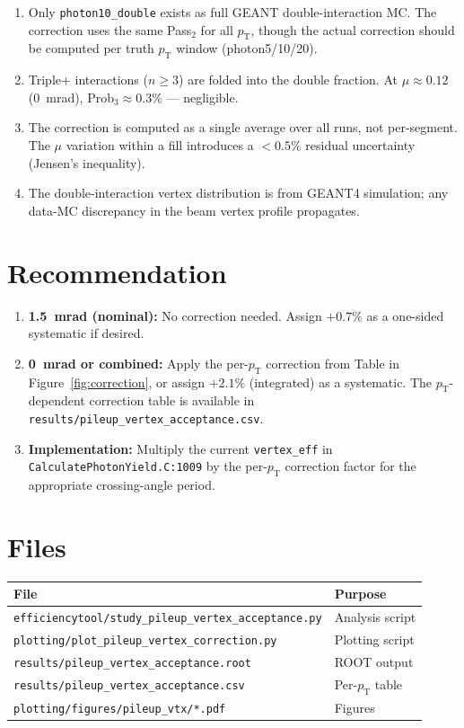 \documentclass[11pt,letterpaper]{article}
\newcommand{\pT}{\ensuremath{p_{\text{T}}}}
\begin{document}
\begin{enumerate}
  \item Only \texttt{photon10\_double} exists as full GEANT
    double-interaction MC. The correction uses the same
    Pass$_2$ for all $\pT$, though the actual correction should
    be computed per truth $\pT$ window (photon5/10/20).
  \item Triple+ interactions ($n \geq 3$) are folded into the
    double fraction. At $\mu \approx 0.12$ (0~mrad),
    Prob$_3 \approx 0.3\%$ --- negligible.
  \item The correction is computed as a single average over all
    runs, not per-segment. The $\mu$ variation within a fill
    introduces a $< 0.5\%$ residual uncertainty (Jensen's inequality).
  \item The double-interaction vertex distribution is from GEANT4
    simulation; any data-MC discrepancy in the beam vertex profile
    propagates.
\end{enumerate}

\section{Recommendation}
\label{sec:recommendation}

\begin{enumerate}
  \item \textbf{1.5~mrad (nominal):} No correction needed.
    Assign $+0.7\%$ as a one-sided systematic if desired.
  \item \textbf{0~mrad or combined:} Apply the per-$\pT$
    correction from Table in Figure~\ref{fig:correction},
    or assign $+2.1\%$ (integrated) as a systematic.
    The $\pT$-dependent correction table is available in
    \texttt{results/pileup\_vertex\_acceptance.csv}.
  \item \textbf{Implementation:} Multiply the current
    \texttt{vertex\_eff} in \texttt{CalculatePhotonYield.C:1009}
    by the per-$\pT$ correction factor for the appropriate
    crossing-angle period.
\end{enumerate}

\section*{Files}
\begin{tabular}{ll}
\toprule
\textbf{File} & \textbf{Purpose} \\
\midrule
\texttt{efficiencytool/study\_pileup\_vertex\_acceptance.py} & Analysis script \\
\texttt{plotting/plot\_pileup\_vertex\_correction.py} & Plotting script \\
\texttt{results/pileup\_vertex\_acceptance.root} & ROOT output \\
\texttt{results/pileup\_vertex\_acceptance.csv} & Per-$\pT$ table \\
\texttt{plotting/figures/pileup\_vtx/*.pdf} & Figures \\
\bottomrule
\end{tabular}
\end{document}

